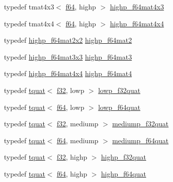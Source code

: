 \begin{DoxyCompactItemize}
\item 
typedef tmat4x3$<$ \hyperlink{group__gtc__type__precision_ga2bba392e555124b36cde6abba349bab3}{f64}, highp $>$ \hyperlink{namespaceglm_acd0f3feb3b494d0f8c5d14c810158874}{highp\+\_\+f64mat4x3}
\item 
typedef tmat4x4$<$ \hyperlink{group__gtc__type__precision_ga2bba392e555124b36cde6abba349bab3}{f64}, highp $>$ \hyperlink{namespaceglm_a5eaa2eab37098d6d953cabeba8a57d57}{highp\+\_\+f64mat4x4}
\item 
typedef \hyperlink{namespaceglm_ab1d0281d417a194926995187e2d72f94}{highp\+\_\+f64mat2x2} \hyperlink{namespaceglm_a7d9fd446fd43310ba6f63c8f9468acc0}{highp\+\_\+f64mat2}
\item 
typedef \hyperlink{namespaceglm_a6fec5193d73c03188d068d07801feef6}{highp\+\_\+f64mat3x3} \hyperlink{namespaceglm_a00c5743b0eba6b437422571f4eda27b8}{highp\+\_\+f64mat3}
\item 
typedef \hyperlink{namespaceglm_a5eaa2eab37098d6d953cabeba8a57d57}{highp\+\_\+f64mat4x4} \hyperlink{namespaceglm_a1ac5d0564721a22765c68c54a0a4f87a}{highp\+\_\+f64mat4}
\item 
typedef \hyperlink{structglm_1_1tquat}{tquat}$<$ \hyperlink{group__gtc__type__precision_ga0ec999b57f5330d9021256e96038df04}{f32}, lowp $>$ \hyperlink{namespaceglm_a59419a39521ca7437483b85c4f53a21a}{lowp\+\_\+f32quat}
\item 
typedef \hyperlink{structglm_1_1tquat}{tquat}$<$ \hyperlink{group__gtc__type__precision_ga2bba392e555124b36cde6abba349bab3}{f64}, lowp $>$ \hyperlink{namespaceglm_a0006c2206d9675a73e5e9e8fd29e1dc2}{lowp\+\_\+f64quat}
\item 
typedef \hyperlink{structglm_1_1tquat}{tquat}$<$ \hyperlink{group__gtc__type__precision_ga0ec999b57f5330d9021256e96038df04}{f32}, mediump $>$ \hyperlink{namespaceglm_a17ccbdb3f59a9a3de48a15d1445fd1ce}{mediump\+\_\+f32quat}
\item 
typedef \hyperlink{structglm_1_1tquat}{tquat}$<$ \hyperlink{group__gtc__type__precision_ga2bba392e555124b36cde6abba349bab3}{f64}, mediump $>$ \hyperlink{namespaceglm_a9b1e5792ab8cc6a732cae5bd7a9328ec}{mediump\+\_\+f64quat}
\item 
typedef \hyperlink{structglm_1_1tquat}{tquat}$<$ \hyperlink{group__gtc__type__precision_ga0ec999b57f5330d9021256e96038df04}{f32}, highp $>$ \hyperlink{namespaceglm_af8fed7ddfeb05fe07ba9d661644b8a47}{highp\+\_\+f32quat}
\item 
typedef \hyperlink{structglm_1_1tquat}{tquat}$<$ \hyperlink{group__gtc__type__precision_ga2bba392e555124b36cde6abba349bab3}{f64}, highp $>$ \hyperlink{namespaceglm_a50e023f42b7d0e2f40eff32ace71ae1a}{highp\+\_\+f64quat}

\end{DoxyCompactItemize}
